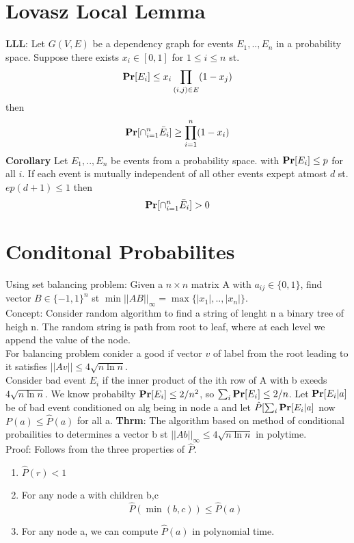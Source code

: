 \documentclass[a4paper]{article}
\def\Pr{\mbox{\textbf{Pr}}}
\begin{document}
\section{Lovasz Local Lemma}

\textbf{LLL}: Let \(G(V,E)\) be a dependency graph for events \(E_1,..,E_n\) in a probability space. Suppose there exists \(x_i \in [0,1]\) for \(1\leq i \leq n\) st.
\[\Pr[E_i] \leq x_i \prod_{(i,j) \in E} (1-x_j)\]
then
\[\Pr[\cap_{i=1}^n \bar{E}_i] \geq \prod_{i=1}^n (1-x_i)\]
\textbf{Corollary} Let \(E_1,..,E_n\) be events from a probability space. with \(\Pr[E_i] \leq p\) for all \(i\). If each event is mutually independent of all other events expept atmost \(d\) st. \(ep(d+1) \leq 1\) then 
\[\Pr[\cap_{i=1}^n \bar{E}_i] > 0\]
\section{Conditonal Probabilites}
Using set balancing problem: Given a \(n\times n\) matrix A with \(a_{ij} \in \{0,1\}\), find vector \(B\in \{-1,1\}^n\) st \(\min |\!|AB|\!|_{\infty} = \max \{|x_1|,..,|x_n|\}\).\\
Concept: Consider random algorithm to  find a string of lenght n a binary tree of heigh n. The random string is path from root to leaf, where at each level we append the value of the node.\\
For balancing problem conider a good if vector \(v\) of label from the root leading to it satisfies \(|\!|Av|\!| \leq 4\sqrt{n\ln n}\). \\
Consider bad event \(E_i\) if the inner product of the ith row of A with b exeeds \(4\sqrt{n\ln n}\). We know probabilty \(\Pr[E_i] \leq 2/n^2\), so \(\sum_i \Pr[E_i] \leq 2/n\). Let \(\Pr[E_i|a]\) be of bad event conditioned on alg being in node a and let \(\hat{P}[\sum_i \Pr[E_i | a]\) now \(P(a) \leq \hat{P}(a)\) for all a.
\textbf{Thrm}: The algorithm based on method of conditional probailities to determines a vector b st \(|\!| Ab|\!|_{\infty} \leq 4\sqrt{n \ln n}\) in polytime.\\
Proof: Follows from the three properties of \(\hat{P}\).
\begin{enumerate}
\item \(\hat{P}(r) < 1\)
\item For any node a with children b,c
\[\hat{P}(\min (b,c)) \leq \hat{P}(a)\]
\item For any node a, we can compute \(\hat{P}(a)\) in polynomial time.
\end{enumerate}
\end{document}
